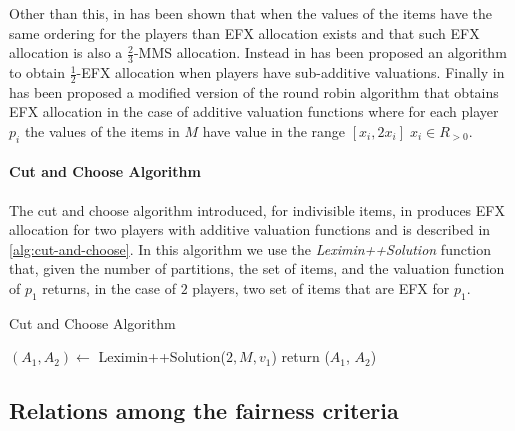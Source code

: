 Other than this, in \cite{DBLP:BarmanM17-efx-same-ordering} has been shown that when the values of the items have the same ordering for the players than EFX allocation exists and that such EFX allocation is also a $\frac{2}{3}$-MMS allocation. Instead in \cite{DBLP:PlautR17-1/2-EFX-approx} has been proposed an algorithm to obtain $\frac{1}{2}$-EFX allocation when players have sub-additive valuations.
Finally in  \cite{DBLP:MaximumNashWelfareandOtherStoriesAboutEFX} has been proposed a modified version of the round robin algorithm that obtains EFX allocation in the case of additive valuation functions where for each player $p_i$ the values of the items in $M$ have value in the range $[x_i, 2x_i]\; x_i\in R_{>0}$.

\paragraph{Cut and Choose Algorithm}
The cut and choose algorithm introduced, for indivisible items, in \cite{DBLP:cut-and-choose-indivisible} produces EFX allocation for two players with additive valuation functions and is described in \ref{alg:cut-and-choose}. In this algorithm we use the \textit{Leximin++Solution} function that, given the number of partitions, the set of items, and the valuation function of $p_1$ returns, in the case of $2$ players, two set of items that are EFX for $p_1$. 
\begin{algorithm}
\caption{Cut and Choose Algorithm}\label{alg:cut-and-choose}
$(A_1, A_2) \gets$ Leximin++Solution($2, M, v_1$)\;
{
 return ($A_1$, $A_2$)\;
}
\end{algorithm}

\subsection{Relations among the fairness criteria}

